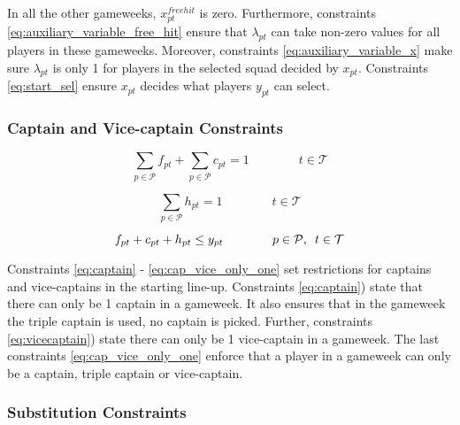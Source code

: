 \newpar

In all the other gameweeks, $x_{pt}^{freehit}$ is zero. Furthermore, constraints \eqref{eq:auxiliary_variable_free_hit} ensure that $\lambda_{pt}$ can take non-zero values for all players in these gameweeks. Moreover, constraints \eqref{eq:auxiliary_variable_x} make sure $\lambda_{pt}$ is only 1 for players in the selected squad decided by $x_{pt}$. Constraints \eqref{eq:start_sel} ensure $x_{pt}$ decides what players $y_{pt}$ can select.

\subsubsection{Captain and Vice-captain Constraints}

\begin{equation} \label{eq:captain}
    \sum_{p \in \mathcal{P}} f_{pt} + \sum_{p \in \mathcal{P}} c_{pt} = 1 \qquad\qquad t \in \mathcal{T}
\end{equation}

\begin{equation} \label{eq:vicecaptain}
    \sum_{p \in \mathcal{P}} h_{pt} = 1 \qquad\qquad t \in \mathcal{T}
\end{equation}

\begin{equation} \label{eq:cap_vice_only_one}
   f_{pt} + c_{pt} + h_{pt} \leq y_{pt}  \qquad\qquad p \in \mathcal{P}, \enskip t \in \mathcal{T}
\end{equation}

Constraints \eqref{eq:captain} - \eqref{eq:cap_vice_only_one} set restrictions for captains and vice-captains in the starting line-up. Constraints \eqref{eq:captain}) state that there can only be 1 captain in a gameweek. It also ensures that in the gameweek the triple captain is used, no captain is picked. Further, constraints \eqref{eq:vicecaptain}) state there can only be 1 vice-captain in a gameweek. The last constraints \eqref{eq:cap_vice_only_one} enforce that a player in a gameweek can only be a captain, triple captain or vice-captain. 

\subsubsection{Substitution Constraints}


